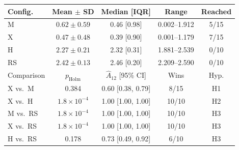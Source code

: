 \begin{tabular}{@{}lcccc@{}}
\toprule
Config. & Mean $\pm$ SD & Median [IQR] & Range & Reached \\
\midrule
M & $0.62 \pm 0.59$ & 0.46 [0.98] & 0.002--1.912 & 5/15 \\
X & $0.47 \pm 0.48$ & 0.39 [0.90] & 0.001--1.179 & 7/15 \\
H & $2.27 \pm 0.21$ & 2.32 [0.31] & 1.881--2.539 & 0/10 \\
RS & $2.42 \pm 0.13$ & 2.46 [0.20] & 2.209--2.590 & 0/10 \\
\midrule
Comparison & $p_\text{Holm}$ & $\hat{A}_{12}$ [95\% CI] & Wins & Hyp. \\
\midrule
X vs.\ M & 0.384 & 0.60 [0.38, 0.79] & 8/15 & H1 \\
X vs.\ H & $1.8\times10^{-4}$ & 1.00 [1.00, 1.00] & 10/10 & H2 \\
M vs.\ RS & $1.8\times10^{-4}$ & 1.00 [1.00, 1.00] & 10/10 & H3 \\
X vs.\ RS & $1.8\times10^{-4}$ & 1.00 [1.00, 1.00] & 10/10 & H3 \\
H vs.\ RS & 0.178 & 0.73 [0.49, 0.92] & 6/10 & H3 \\
\bottomrule
\end{tabular}
